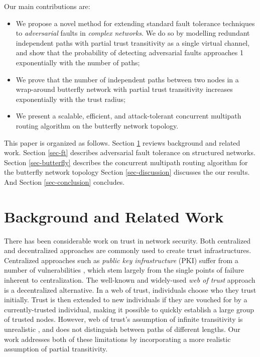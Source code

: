 \documentclass{sig-alternate-05-2015}
\begin{document}
Our main contributions are:
\begin{itemize}
\item{
We propose a novel method for extending standard fault tolerance techniques to
{\em adversarial} faults in {\em complex networks}.
We do so by modelling redundant independent paths
with partial trust transitivity as a single virtual channel,
and show that the probability of detecting adversarial faults
approaches 1 exponentially with the number of paths;
}
\item{We prove that the number of independent paths between two nodes
in a wrap-around butterfly network with partial trust transitivity
increases exponentially with the trust radius;
}
\item{We present a scalable, efficient, and attack-tolerant concurrent
multipath routing algorithm on the butterfly network topology.}
\end{itemize}

This paper is organized as follows.
Section \ref{sec-related} reviews background and related work.
Section \ref{sec-ft} describes adversarial fault tolerance on
structured networks.
Section \ref{sec-butterfly} describes the concurrent multipath routing
algorithm for the butterfly network topology
Section \ref{sec-discussion} discusses the our results.
And Section \ref{sec-conclusion} concludes.

\section{Background and Related Work}
\label{sec-related}

There has been considerable work on trust in network security.
Both centralized and decentralized approaches are commonly used to create
trust infrastructures.
Centralized approaches such as {\em public key infrastructure} (PKI)
suffer from a number of vulnerabilities
\cite{ellison_ten_2000},
which stem largely from the single points of failure inherent to
centralization.
The well-known and widely-used {\em web of trust} approach
\cite{zimmermann_official_1995,ferguson_practical_2003}
is a decentralized alternative.
In a web of trust,
individuals choose who they trust initially.
Trust is then extended to new individuals if they are vouched for by a
currently-trusted individual,
making it possible to quickly establish a large group of trusted nodes.
However, web of trust's assumption of infinite transitivity is unrealistic
\cite{christianson_why_1997},
and does not distinguish between paths of different lengths.
Our work addresses both of these limitations by incorporating a more realistic
assumption of partial transitivity.
\end{document}
